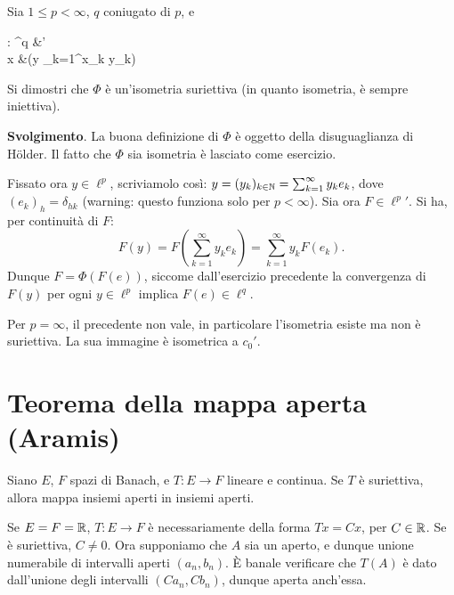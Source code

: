 \begin{exercise}
	Sia $1 \leq p < \infty$, $q$ coniugato di $p$, e
	\begin{eqalign*}
		\Phi : \ell^q &'\\
			x &\longmapsto (y \mapsto \sum_{k=1}^\infty x_k y_k)
	\end{eqalign*}
	Si dimostri che $\Phi$ è un'isometria suriettiva (in quanto isometria, è sempre iniettiva).

	\textbf{Svolgimento}. La buona definizione di $\Phi$ è oggetto della disuguaglianza di H\"older. Il fatto che $\Phi$ sia isometria è lasciato come esercizio.

	Fissato ora $y \in \ell^p$, scriviamolo così: $y=(y_k)_{k \in \mathbb{N}} = \sum_{k=1}^\infty y_k e_k$, dove $(e_k)_h = \delta_{hk}$ (warning: questo funziona solo per $p < \infty$). Sia ora $F \in {\ell^p}'$. Si ha, per continuità di $F$:
	\begin{equation*}
		F(y) = F({\textstyle \sum_{k=1}^\infty} y_k e_k) = \sum_{k=1}^\infty y_k F(e_k).
	\end{equation*}
	Dunque $F = \Phi(F(e))$, siccome dall'esercizio precedente la convergenza di $F(y)$ per ogni $y \in \ell^p$ implica $F(e) \in \ell^q$.
\end{exercise}

\begin{remark}
	Per $p=\infty$, il precedente non vale, in particolare l'isometria esiste ma non è suriettiva. La sua immagine è isometrica a $c_0'$.
\end{remark}

\section{Teorema della mappa aperta (Aramis)}
\begin{theorem}
	Siano $E$, $F$ spazi di Banach, e $T : E \to F$ lineare e continua. Se $T$ è suriettiva, allora mappa insiemi aperti in insiemi aperti.
\end{theorem}

\begin{example}
	Se $E = F = \mathbb{R}$, $T : E \to F$ è necessariamente della forma $Tx = Cx$, per $C \in \mathbb{R}$. Se è suriettiva, $C \neq 0$. Ora supponiamo che $A$ sia un aperto, e dunque unione numerabile di intervalli aperti $(a_n, b_n)$. È banale verificare che $T(A)$ è dato dall'unione degli intervalli $(Ca_n, Cb_n)$, dunque aperta anch'essa.
\end{example}

